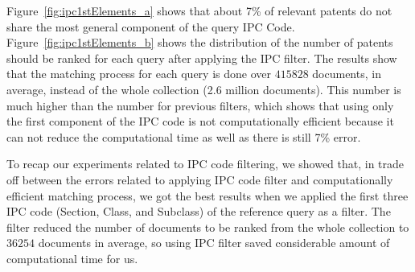 Figure~\ref{fig:ipc1stElements_a} shows that about 7\% of relevant patents do not share the most general component of the query IPC Code. 
Figure~\ref{fig:ipc1stElements_b} shows the distribution of the number of patents should be ranked for each query after applying the IPC filter.
The results show that the matching process for each query is done over $ 415828 $ documents, in average, instead of the whole collection (2.6 million documents). This number is much higher than the number for previous filters, which shows that using only the first component of the IPC code is not computationally efficient because it can not reduce the computational time as well as there is still 7\% error. 

To recap our experiments related to IPC code filtering, we showed that, in trade off between the errors related to applying IPC code filter and computationally efficient matching process, we got the best results when we applied the first three IPC code (Section, Class, and Subclass) of the reference query as a filter. The filter reduced the number of documents to be ranked from the whole collection to $ 36254 $ documents in average, so using IPC filter saved considerable amount of computational time for us.

